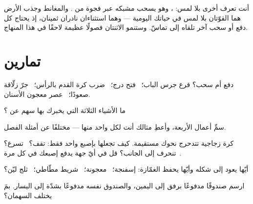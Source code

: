 \begin{remark}\label{rem:g2:pushes-and-pulls:magnets}
أنت تعرف  أخرى بلا لمس: ، وهو يسحب مشبكه عبر فجوة من
. والمغانط وجذب الأرض هما القوّتان بلا لمس في حياتك اليومية
--- وهما استثناءان نادران ثمينان، إذ يحتاج كل دفع أو سحب آخر
تلقاه إلى تماسّ. وستنمو الاثنتان فصولًا عظيمة لاحقًا في هذا
المنهاج.
\end{remark}

\section{تمارين}

\begin{exercise}[$\star$]\label{exo:g2:pushes-and-pulls:1}
دفع أم سحب؟ قرع جرس الباب؛ \ فتح درج؛ \ ضرب كرة القدم بالرأس؛
\ جرّ زلّاقة صعودًا؛ \ عصر معجون الأسنان.
\end{exercise}

\begin{exercise}[$\star$]\label{exo:g2:pushes-and-pulls:2}
ما الأشياء الثلاثة التي يخبرك بها سهم  عن ؟
\end{exercise}

\begin{exercise}[$\star$]\label{exo:g2:pushes-and-pulls:3}
سمِّ أعمال  الأربعة، وأعطِ مثالك أنت لكل واحد منها ---
مختلفًا عن أمثلة الفصل.
\end{exercise}

\begin{exercise}[$\star$]\label{exo:g2:pushes-and-pulls:4}
كرة زجاجية تتدحرج نحوك مستقيمة. كيف تجعلها بإصبع واحد فقط:
تقف؟ \ تسرع؟ \ تنحرف إلى الجانب؟ قل في أيّ جهة يدفع إصبعك في
كل مرة.
\end{exercise}

\begin{exercise}[$\star$]\label{exo:g2:pushes-and-pulls:5}
أيّها يعود إلى شكله وأيّها يحفظ الغمّازة: إسفنجة؛ \ معجونة؛
\ شريط مطّاطي؛ \ ثلج ليّن؟
\end{exercise}

\begin{exercise}[$\star$]\label{exo:g2:pushes-and-pulls:6}
ارسم صندوقًا مدفوعًا برفق إلى اليمين، والصندوق نفسه مدفوعًا
بشدّة إلى اليسار. بمَ يختلف السهمان؟
\end{exercise}

